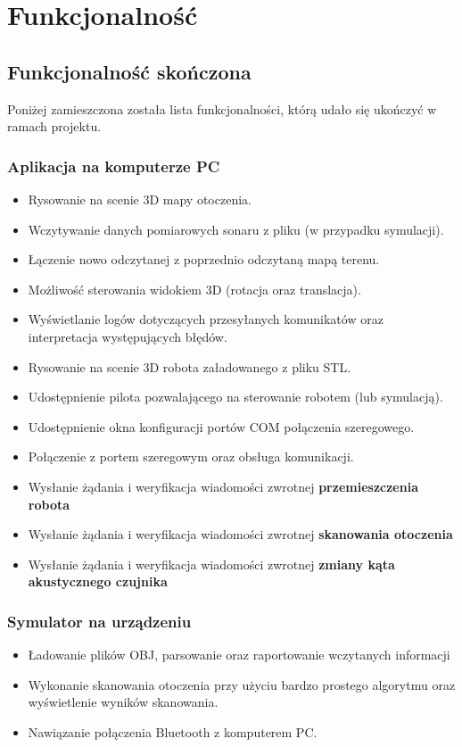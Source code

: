 \documentclass[a4paper,12pt]{article}
\begin{document}
\section{Funkcjonalność}
\subsection{Funkcjonalność skończona}
Poniżej zamieszczona została lista funkcjonalności, którą udało się ukończyć w ramach projektu. 
\subsubsection{Aplikacja na komputerze PC}
\begin{itemize}
\item Rysowanie na scenie 3D mapy otoczenia.
\item Wczytywanie danych pomiarowych sonaru z pliku (w przypadku symulacji).
\item Łączenie nowo odczytanej z poprzednio odczytaną mapą terenu. 
\item Możliwość sterowania widokiem 3D (rotacja oraz translacja).
\item Wyświetlanie logów dotyczących przesyłanych komunikatów oraz interpretacja występujących błędów.
\item Rysowanie na scenie 3D robota załadowanego z pliku STL.
\item Udostępnienie pilota pozwalającego na sterowanie robotem (lub symulacją).
\item Udostępnienie okna konfiguracji portów COM połączenia szeregowego.
\item Połączenie z portem szeregowym oraz obsługa komunikacji.
\item Wysłanie żądania i weryfikacja wiadomości zwrotnej \textbf{przemieszczenia robota}
\item Wysłanie żądania i weryfikacja wiadomości zwrotnej \textbf{skanowania otoczenia}
\item Wysłanie żądania i weryfikacja wiadomości zwrotnej \textbf{zmiany kąta akustycznego czujnika}
\end{itemize}
\subsubsection{Symulator na urządzeniu}
\begin{itemize}
\item Ładowanie plików OBJ, parsowanie oraz raportowanie wczytanych informacji
\item Wykonanie skanowania otoczenia przy użyciu bardzo prostego algorytmu oraz wyświetlenie wyników skanowania.
\item Nawiązanie połączenia Bluetooth z komputerem PC.
\end{itemize}
\end{document}
